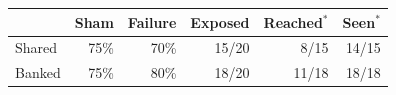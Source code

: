 \begin{tabular}{lrrrrr}\toprule & Sham & Failure & Exposed & Reached$^*$ & Seen$^*$\\\midrule
Shared & 75\% & 70\% & 15/20 & 8/15 & 14/15 \\
Banked & 75\% & 80\% & 18/20 & 11/18 & 18/18 \\
\bottomrule\end{tabular}
